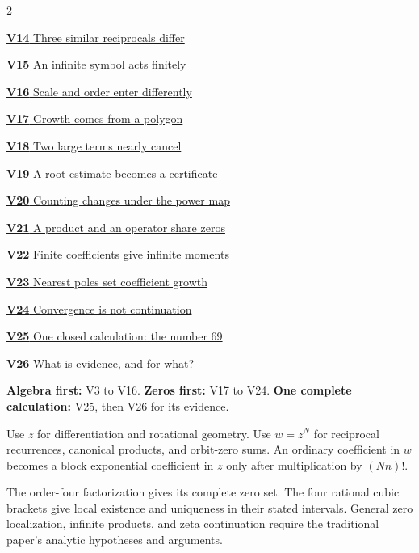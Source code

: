 \documentclass[11pt,letterpaper]{article}
\newcommand{\head}[1]{\par\vspace{2pt}{\sffamily\bfseries\normalsize #1}\par\vspace{1pt}}
\begin{document}
\begin{multicols}{2}
{\small\noindent\hyperlink{vpage14}{\textbf{V14} Three similar reciprocals differ}\par\smallskip}
{\small\noindent\hyperlink{vpage15}{\textbf{V15} An infinite symbol acts finitely}\par\smallskip}
{\small\noindent\hyperlink{vpage16}{\textbf{V16} Scale and order enter differently}\par\smallskip}
{\small\noindent\hyperlink{vpage17}{\textbf{V17} Growth comes from a polygon}\par\smallskip}
{\small\noindent\hyperlink{vpage18}{\textbf{V18} Two large terms nearly cancel}\par\smallskip}
{\small\noindent\hyperlink{vpage19}{\textbf{V19} A root estimate becomes a certificate}\par\smallskip}
{\small\noindent\hyperlink{vpage20}{\textbf{V20} Counting changes under the power map}\par\smallskip}
{\small\noindent\hyperlink{vpage21}{\textbf{V21} A product and an operator share zeros}\par\smallskip}
{\small\noindent\hyperlink{vpage22}{\textbf{V22} Finite coefficients give infinite moments}\par\smallskip}
{\small\noindent\hyperlink{vpage23}{\textbf{V23} Nearest poles set coefficient growth}\par\smallskip}
{\small\noindent\hyperlink{vpage24}{\textbf{V24} Convergence is not continuation}\par\smallskip}
{\small\noindent\hyperlink{vpage25}{\textbf{V25} One closed calculation: the number 69}\par\smallskip}
{\small\noindent\hyperlink{vpage26}{\textbf{V26} What is evidence, and for what?}\par\smallskip}
\end{multicols}
\medskip
\head{Three reading routes}
\textbf{Algebra first:} V3 to V16.
\textbf{Zeros first:} V17 to V24.
\textbf{One complete calculation:} V25, then V26 for its evidence.
\head{Keep the two variables distinct}
Use $z$ for differentiation and rotational geometry. Use $w=z^N$ for
reciprocal recurrences, canonical products, and orbit-zero sums. An ordinary
coefficient in $w$ becomes a block exponential coefficient in $z$ only after
multiplication by $(Nn)!$.
\head{Exact models and analytic conclusions}
The order-four factorization gives its complete zero set. The four rational
cubic brackets give local existence and uniqueness in their stated intervals.
General zero localization, infinite products, and zeta continuation require
the traditional paper's analytic hypotheses and arguments.
\clearpage
{}
\begingroup
{}\fontsize{10}{12}\selectfont
\setlength{\parskip}{3pt}\setlength{\abovedisplayskip}{6pt}\setlength{\belowdisplayskip}{6pt}

\endgroup
\end{document}
